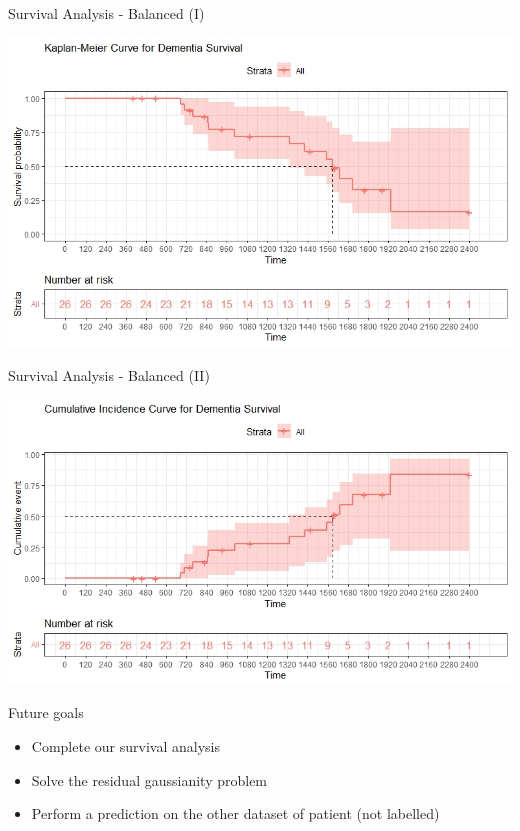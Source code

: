 \documentclass{beamer}
\begin{document}
	\begin{frame}{Survival Analysis - Balanced (I)}
	
		\begin{center}
			\includegraphics[width=\columnwidth]{kaplan-meier_bilanciati.jpeg}
		\end{center}
	\end{frame}
	
	\begin{frame}{Survival Analysis - Balanced (II)}
	
		\begin{center}
			\includegraphics[width=\columnwidth]{cumulative_bilanciati.jpeg}
		\end{center}
	\end{frame}

	
	\begin{frame}{Future goals}
	
	\begin{itemize}
		\item Complete our survival analysis
		\item Solve the residual gaussianity problem
		\item Perform a prediction on the other dataset of patient (not labelled)
	\end{itemize}
		
	\end{frame}
	
	
\end{document}
